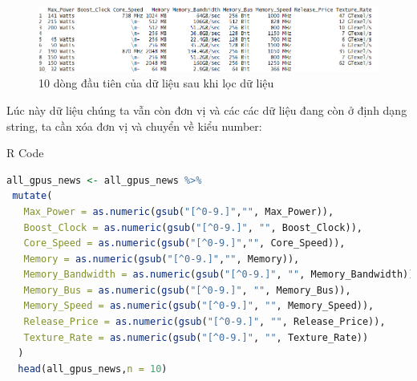 \documentclass[a4paper]{article}
\begin{document}
\newpage
            \begin{figure}[H]
                \centering
                \includegraphics[width=\linewidth]{4. GPU/Console/console2.png}
                \caption{10 dòng đầu tiên của dữ liệu sau khi lọc dữ liệu}
            \end{figure}
            \vspace{-16pt}
            \hspace{1pt}
            Lúc này dữ liệu chúng ta vẫn còn đơn vị và các các dữ liệu đang còn ở định dạng string, ta cần xóa đơn vị và chuyển về kiểu number:

\begin{mybox}{R Code}
\begin{lstlisting}[language={R}]
 all_gpus_news <- all_gpus_news %>%
 mutate(
   Max_Power = as.numeric(gsub("[^0-9.]","", Max_Power)),
   Boost_Clock = as.numeric(gsub("[^0-9.]", "", Boost_Clock)),
   Core_Speed = as.numeric(gsub("[^0-9.]","", Core_Speed)),
   Memory = as.numeric(gsub("[^0-9.]","", Memory)),
   Memory_Bandwidth = as.numeric(gsub("[^0-9.]", "", Memory_Bandwidth)),
   Memory_Bus = as.numeric(gsub("[^0-9.]", "", Memory_Bus)),
   Memory_Speed = as.numeric(gsub("[^0-9.]", "", Memory_Speed)),
   Release_Price = as.numeric(gsub("[^0-9.]", "", Release_Price)),
   Texture_Rate = as.numeric(gsub("[^0-9.]", "", Texture_Rate))
  )
  head(all_gpus_news,n = 10)
\end{lstlisting}
\end{mybox}
\end{document}
